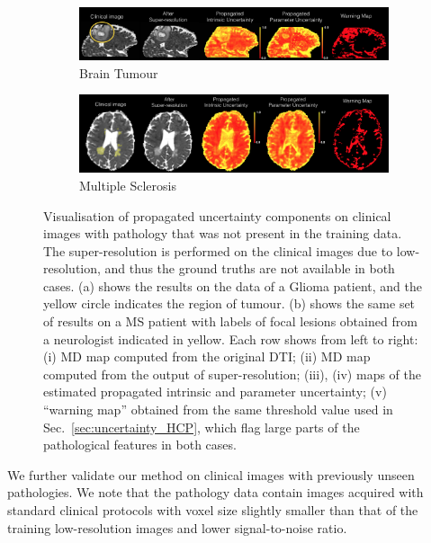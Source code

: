 \begin{figure}[ht]
	\centering
	\begin{subfigure}{\textwidth}
		\caption{Brain Tumour}
		\includegraphics[width=\linewidth]{chapter_3/figures/fig_tumour_02.png}
	\end{subfigure}
	\begin{subfigure}{\textwidth}
		\vspace{2mm}
		\caption{Multiple Sclerosis}
		\includegraphics[width=\linewidth]{chapter_3/figures/fig_ms_03.png}
	\end{subfigure}	
	\caption{\footnotesize Visualisation of propagated uncertainty components on clinical images with pathology that was not present in the training data. The super-resolution is performed on the clinical images due to low-resolution, and thus the ground truths are not available in both cases. (a) shows the results on the data of a Glioma patient, and the yellow circle indicates the region of tumour. (b) shows the same set of results on a MS patient with labels of focal lesions obtained from a neurologist indicated in yellow. Each row shows from left to right: (i) MD map computed from the original DTI; (ii) MD map computed from the output of super-resolution; (iii), (iv) maps of the estimated propagated intrinsic and parameter uncertainty; (v) ``warning map'' obtained from the same threshold value used in Sec.~\ref{sec:uncertainty_HCP}, which flag large parts of the pathological features in both cases. }
	\label{fig:components_pathology}
\end{figure}

We further validate our method on clinical images with previously unseen pathologies. We note that the pathology data contain images acquired with standard clinical protocols with voxel size slightly smaller than that of the training low-resolution images and lower signal-to-noise ratio. 

